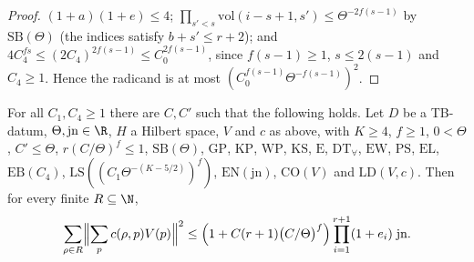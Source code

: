 \begin{proof}
$(1+a)(1+e)\le4$; $\prod_{s'<s}\mathrm{vol}(i-s+1,s')\le\Theta^{-2f(s-1)}$ by $\mathrm{SB}(\Theta)$ (the indices satisfy
$b+s'\le r+2$); and $4C_4^{fs}\le(2C_4)^{2f(s-1)}\le C_0^{2f(s-1)}$, since $f(s-1)\ge1$, $s\le2(s-1)$ and $C_4\ge1$. Hence the
radicand is at most $(C_0^{f(s-1)}\Theta^{-f(s-1)})^2$.
\end{proof}

\begin{theorem}[Theorem A]\label{pf:thmS:thmA}
For all $C_1,C_4\ge1$ there are $C,C'$ such that the following holds. Let $D$ be a TB-datum, $\Theta,\mathrm{jn}\in\R$,
$H$ a Hilbert space, $V$ and $c$ as above, with $K\ge4$, $f\ge1$, $0<\Theta$, $C'\le\Theta$, $r(C/\Theta)^f\le1$,
$\mathrm{SB}(\Theta)$, $\mathrm{GP}$, $\mathrm{KP}$, $\mathrm{WP}$, $\mathrm{KS}$,
$\mathrm{E}$, $\mathrm{DT}_{\forall}$, $\mathrm{EW}$, $\mathrm{PS}$, $\mathrm{EL}$,
$\mathrm{EB}(C_4)$, $\mathrm{LS}((C_1\Theta^{-(K-5/2)})^f)$, $\mathrm{EN}(\mathrm{jn})$,
$\mathrm{CO}(V)$ and $\mathrm{LD}(V,c)$. Then for every finite $R\subseteq\N$,
\begin{equation}\label{eq:pf:thmS:thmA}
\sum_{\rho\in R}\Bigl\|\sum_pc(\rho,p)V(p)\Bigr\|^2\le\Bigl(1+C(r+1)\bigl(C/\Theta\bigr)^f\Bigr)\prod_{i=1}^{r+1}(1+e_i)\;\mathrm{jn}.
\end{equation}
\end{theorem}

